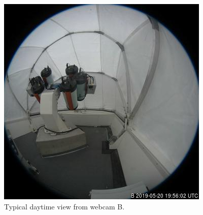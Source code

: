 \begin{figure}[t]
\begin{center}
\fi
\ifddotioan
\includegraphics[height=0.6\linewidth]{figures/ddoti-webcam-b.jpg}
\fi
\end{center}
\caption{Typical daytime view from {\projectname} webcam B.}
\label{figure:webcam-b-view}
\end{figure}

